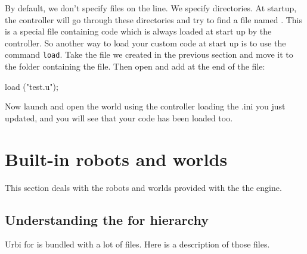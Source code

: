 By default, we don't specify files on the \webots {}
line. We specify directories.  At startup, the \urbi controller will
go through these directories and try to find a file named
. This is a special file containing \us code
which is always loaded at start up by the \urbi controller. So another
way to load your custom \urbi code at start up is to use the command
\lstinline|load|.  Take the  file we created in the previous
section and move it to the folder containing the 
file. Then open  and add at the end of the file:

\begin{urbiunchecked}
load ("test.u");
\end{urbiunchecked}
Now launch \webots and open the world using the \urbi controller loading
the \urbi.ini you just updated, and you will see that your code has
been loaded too.


\section{Built-{}in robots and worlds}

This section deals with the robots and worlds provided with the the
engine.


\subsection{Understanding the \urbi for \webots hierarchy}

 Urbi for \webots is bundled with a lot of files. Here is a description of
those files.

